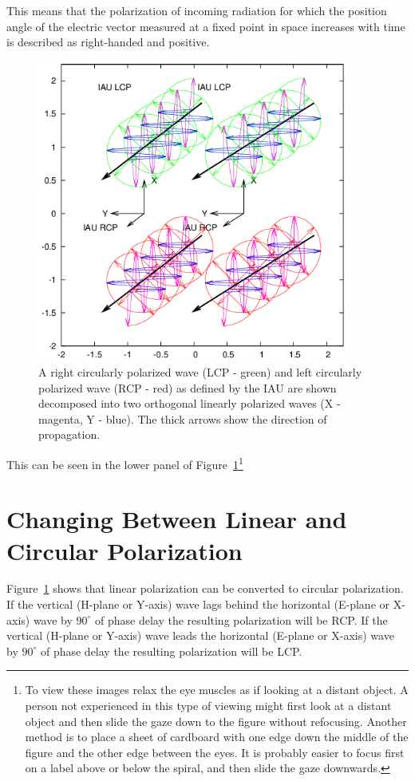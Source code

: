 \documentclass[letterpaper,11pt]{book}
\begin{document}
This means that the polarization of incoming radiation for which the position
angle of the electric vector measured at a fixed point in space
increases with time is described as right-handed and positive.
\begin{figure}[h!tb]
\begin{center}
\includegraphics[width=4in]{circular.png}
\caption[Circular Polarization]
{\label{fig:circ_pol} A right circularly polarized wave (LCP - green) and left
circularly polarized wave (RCP - red)
as defined by the IAU are shown decomposed into two
orthogonal linearly polarized waves (X - magenta, Y - blue). The thick arrows
show the direction of propagation.}
\end{center}
\end{figure}
This can be seen in the lower panel of Figure~\ref{fig:circ_pol}\footnote{To 
view these images relax the eye muscles as if
looking at a distant object. A person not experienced in this
type of viewing might first look at a distant object and then
slide the gaze down to the figure without refocusing. Another
method is to place a sheet of cardboard with one edge down the
middle of the figure and the other edge between the eyes. It is
probably easier to focus first on a label above or below
the spiral, and then slide the gaze downwards.}

\section{Changing Between Linear and Circular
Polarization}\label{sec:lin-circ}

Figure~\ref{fig:circ_pol} shows that linear polarization can be converted to 
circular polarization.  If the vertical (H-plane or Y-axis) wave lags
behind the horizontal (E-plane or X-axis) wave by $90^{\circ}$ of
phase delay the resulting polarization will be RCP.
If the vertical (H-plane or Y-axis) wave leads
the horizontal (E-plane or X-axis) wave by $90^{\circ}$ of
phase delay the resulting polarization will be LCP.
\end{document}
